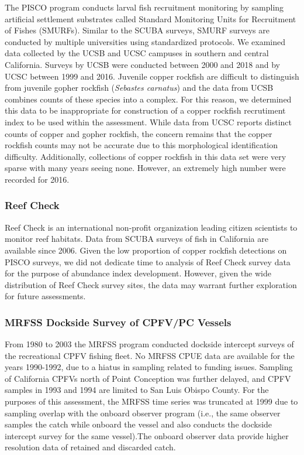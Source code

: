\documentclass[11pt,
  english,
  letterpaper,
]{article}
\begin{document}
The PISCO program conducts larval fish recruitment monitoring by sampling artificial settlement substrates called Standard Monitoring Units for Recruitment of Fishes (SMURFs). Similar to the SCUBA surveys, SMURF surveys are conducted by multiple universities using standardized protocols. We examined data collected by the UCSB and UCSC campuses in southern and central California. Surveys by UCSB were conducted between 2000 and 2018 and by UCSC between 1999 and 2016. Juvenile copper rockfish are difficult to distinguish from juvenile gopher rockfish (\emph{Sebastes carnatus}) and the data from UCSB combines counts of these species into a complex. For this reason, we determined this data to be inappropriate for construction of a copper rockfish recrutiment index to be used within the assessment. While data from UCSC reports distinct counts of copper and gopher rockfish, the concern remains that the copper rockfish counts may not be accurate due to this morphological identification difficulty. Additionally, collections of copper rockfish in this data set were very sparse with many years seeing none. However, an extremely high number were recorded for 2016.

\hypertarget{reef-check}{%
\subsubsection{Reef Check}\label{reef-check}}

Reef Check is an international non-profit organization leading citizen scientists to monitor reef habitats. Data from SCUBA surveys of fish in California are available since 2006. Given the low proportion of copper rockfish detections on PISCO surveys, we did not dedicate time to analysis of Reef Check survey data for the purpose of abundance index development. However, given the wide distribution of Reef Check survey sites, the data may warrant further exploration for future assessments.

\hypertarget{mrfss-dockside-survey-of-cpfvpc-vessels}{%
\subsubsection{MRFSS Dockside Survey of CPFV/PC Vessels}\label{mrfss-dockside-survey-of-cpfvpc-vessels}}

From 1980 to 2003 the MRFSS program conducted dockside intercept surveys of the recreational CPFV fishing fleet. No MRFSS CPUE data are available for the years 1990-1992, due to a hiatus in sampling related to funding issues. Sampling of California CPFVs north of Point Conception was further delayed, and CPFV samples in 1993 and 1994 are limited to San Luis Obispo County. For the purposes of this assessment, the MRFSS time series was truncated at 1999 due to sampling overlap with the onboard observer program (i.e., the same observer samples the catch while onboard the vessel and also conducts the dockside intercept survey for the same vessel).The onboard observer data provide higher resolution data of retained and discarded catch.
\end{document}
